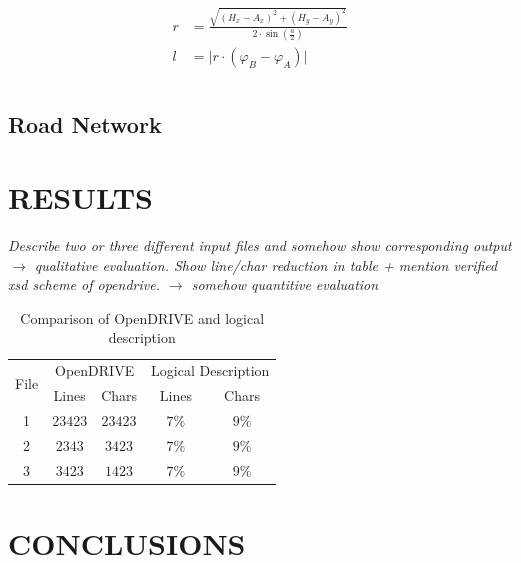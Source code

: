 \documentclass[a4paper, 10pt, conference]{ieeeconf}      %
\begin{document}
    \begin{align}
        \begin{split}           
        r &= \frac{\sqrt{\left(H_x - A_x\right)^2 + \left(H_y - A_y\right)^2}}{2 \cdot \sin\left(\frac{a}{2}\right)} \\
        l &= \vert r \cdot \left(\varphi_B - \varphi_A\right) \vert \\  
        \end{split}
    \end{align}


\subsection{Road Network}

\section{RESULTS}
\textit{Describe two or three different input files and somehow show corresponding output $\rightarrow$ qualitative evaluation. Show line/char reduction in table + mention verified xsd scheme of opendrive. $\rightarrow$ somehow quantitive evaluation}
\begin{table}[h]
\caption{Comparison of OpenDRIVE and logical description}
\label{tab_comparison}
\def\arraystretch{1.5}
\begin{center}
\begin{tabular}{c|cccc}
\multirow{2}{*}{File} & \multicolumn{2}{c}{OpenDRIVE} & \multicolumn{2}{c}{Logical Description}\\
& Lines & Chars & Lines & Chars \\
\hline
1 & $23423$ & $23423$& $7\%$ &$9\%$\\
2 & $2343$ & $3423$& $7\%$ &$9\%$\\
3 & $3423$ & $1423$& $7\%$ &$9\%$
\end{tabular}
\end{center}
\end{table}

\section{CONCLUSIONS}

\addtolength{\textheight}{-12cm}   %
\end{document}
